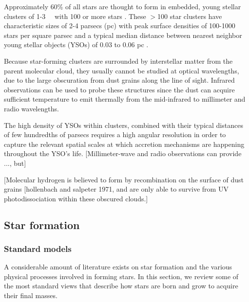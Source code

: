 
Approximately 60\% of all stars are thought to form in embedded, young stellar clusters of 1-\SI{3}{\mega\year} with 100 or more stars \citep{Porras:2003kxa,Allen:2007wqa}. These $>$100 star clusters have characteristic sizes of 2-4 parsecs (pc) with peak surface densities of 100-\si{1000} stars per square parsec and a typical median distance between nearest neighbor young stellar objects (YSOs) of 0.03 to 0.06 pc \citep{Gutermuth:2009gca}.

Because star-forming clusters are surrounded by interstellar matter from the parent molecular cloud, they usually cannot be studied at optical wavelengths, due to the large obscuration from dust grains along the line of sight. Infrared observations can be used to probe these structures since the dust can acquire sufficient temperature to emit thermally from the mid-infrared to millimeter and radio wavelengths. 

The high density of YSOs within clusters, combined with their typical distances of few hundredths of parsecs requires a high angular resolution in order to capture the relevant spatial scales at which accretion mechanisms are happening throughout the YSO's life. [Millimeter-wave and radio observations can provide ..., but]



[Molecular hydrogen is believed to form by recombination on the surface of dust grains [hollenbach and salpeter 1971, and are only able to survive from UV photodissociation within these obscured clouds.]

\subsection{Star formation}

\subsubsection{Standard models}

A considerable amount of literature exists on star formation and the various physical processes involved in forming stars. In this section, we review some of the most standard views that describe how stars are born and grow to acquire their final masses.

